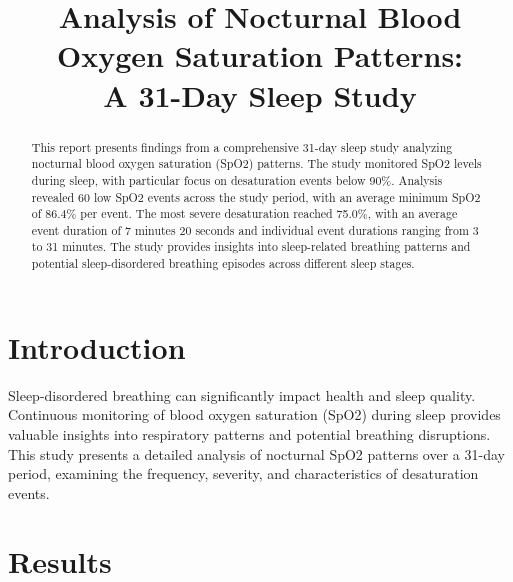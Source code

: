 \documentclass{article}
\title{Analysis of Nocturnal Blood Oxygen Saturation Patterns: \\ A 31-Day Sleep Study}
\begin{document}
\maketitle

\begin{abstract}
This report presents findings from a comprehensive 31-day sleep study analyzing nocturnal blood oxygen saturation (SpO2) patterns. The study monitored SpO2 levels during sleep, with particular focus on desaturation events below 90\%. Analysis revealed 60 low SpO2 events across the study period, with an average minimum SpO2 of 86.4\% per event. The most severe desaturation reached 75.0\%, with an average event duration of 7 minutes 20 seconds and individual event durations ranging from 3 to 31 minutes. The study provides insights into sleep-related breathing patterns and potential sleep-disordered breathing episodes across different sleep stages.
\end{abstract}


\section{Introduction}
Sleep-disordered breathing can significantly impact health and sleep quality. Continuous monitoring of blood oxygen saturation (SpO2) during sleep provides valuable insights into respiratory patterns and potential breathing disruptions. This study presents a detailed analysis of nocturnal SpO2 patterns over a 31-day period, examining the frequency, severity, and characteristics of desaturation events.

\section{Results}
\end{document}

